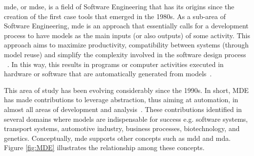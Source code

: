 \ac{mde}, or \ac{mdse}, is a field of Software Engineering that has its origins since the creation of the first \ac{case} tools that emerged in the 1980s.
As a sub-area of Software Engineering, \ac{mde} is an approach that essentially calls for a development process to have models as the main inputs (or also outputs) of some activity.
This approach aims to maximize productivity, compatibility between systems (through model reuse) and simplify the complexity involved in the software design process ~\cite{Brambilla:2017}.
In this way, this results in programs or computer activities executed in hardware or software that are automatically generated from models~\cite{Sommerville:2015}.

This area of study has been evolving considerably since the 1990s.
In short, MDE has made contributions to leverage abstraction, thus aiming at automation, in almost all areas of development and analysis~\cite{Bucchiarone:2020}.
These contributions identified in several domains where models are indispensable for success e.g. software systems, transport systems, automotive industry, business processes, biotechnology, and genetics.
Conceptually, \ac{mde} supports other concepts such as \ac{mdd} and \ac{mda}. 
Figure \ref{fig:MDE} illustrates the relationship among these concepts.


